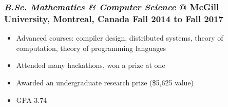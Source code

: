 \documentclass{article}
\newcommand\VRule{\color{lightgray}\vrule width 0.5pt}
\newcommand\jobtitle\textit
\providecommand{\tightlist}{%
  \setlength{\itemsep}{0pt}\setlength{\parskip}{0pt}}
\begin{document}
\subsubsection*{
  \jobtitle{B.Sc. Mathematics \& Computer Science} @ McGill University, Montreal, Canada
  \hfill Fall 2014 to Fall 2017
}
\begin{itemize}\tightlist
  \item Advanced courses: compiler design, distributed systems, theory of computation, theory of
    programming languages
  \item Attended many hackathons, won a prize at one
  \item Awarded an undergraduate research prize (\$5,625 value)
  \item GPA $3.74$
\end{itemize}



\end{document}
